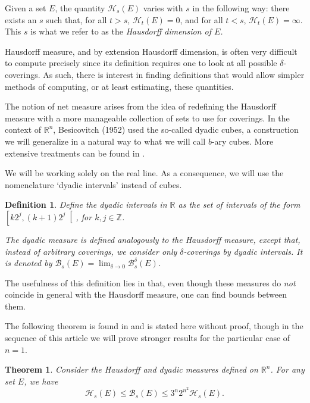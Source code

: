 \documentclass[11pt, reqno]{amsart}
\newcommand{\R}{\mathbb{R}}
\newcommand{\Z}{\mathbb{Z}}
\newcommand{\HH}{\mathcal{H}}
\newcommand{\BB}{\mathcal{B}}
\newtheorem{theorem}{Theorem}
\newtheorem{definition}{Definition}
\begin{document}
Given a set $E$, the quantity $\HH_s(E)$ varies with $s$ in the following way: there exists an $s$ such that, for all $t > s$, $\HH_t(E) = 0$, and for all $t < s$, $\HH_t(E) = \infty$. This $s$ is what we refer to as the \emph{Hausdorff dimension of $E$.}

\smallskip

Hausdorff measure, and by extension Hausdorff dimension, is often very difficult to compute precisely since its definition requires one to look at all possible $\delta$-coverings. As such, there is interest in finding definitions that would allow simpler methods of computing, or at least estimating, these quantities.   

The notion of net measure arises from the idea of redefining the Hausdorff measure with a more manageable collection of sets to use for coverings. In the context of $\R^n$, Besicovitch (1952) used the so-called dyadic cubes, a construction we will generalize in a natural way to what we will call $b$-ary cubes. More extensive treatments can be found in \cite{falconer, rogers}.

We will be working solely on the real line. As a consequence, we will use the nomenclature `dyadic intervals' instead of cubes.

\begin{definition}
Define the \emph{dyadic intervals} in $\R$ as the set of intervals of the form $\left[ k 2^j, (k+1) 2^j \right[$, for $k, j \in \Z$.

The dyadic measure is defined analogously to the Hausdorff measure, except that, instead of arbitrary coverings, we consider only $\delta$-coverings by dyadic intervals. It is denoted by $\BB_s(E) = \lim_{\delta \to 0} \BB_s^\delta(E)$.
\end{definition}

The usefulness of this definition lies in that, even though these measures do \emph{not} coincide in general with the Hausdorff measure, one can find bounds between them.

The following theorem is found in \cite{falconer, rogers} and is stated here without proof, though in the sequence of this article we will prove stronger results for the particular case of $n = 1$.

\begin{theorem}\label{badbound}
Consider the Hausdorff and dyadic measures defined on $\R^n$. For any set $E$, we have
\begin{equation}\label{badboundeq}
\HH_s(E) \leq \BB_s(E) \leq 3^n 2^{n^2} \HH_s(E).
\end{equation}
\end{theorem}
\end{document}
